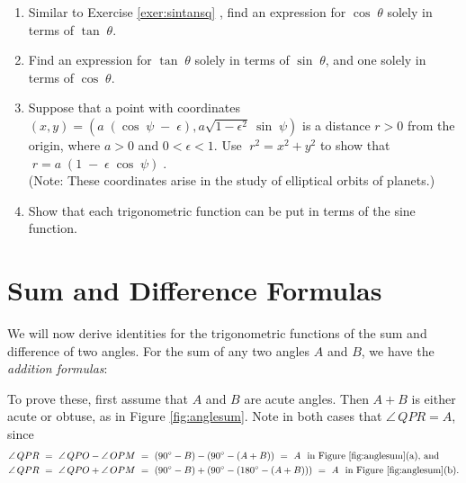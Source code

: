 {\begin{enumerate}[\bfseries 1.]
  \ref{fig:exer2.1.21} to prove the identity for $\theta$ in the other quadrants. Does the identity
  hold if $\theta$ is on either axis?
[{[\bfseries 1.]}]
 \item Similar to Exercise \ref{exer:sintansq} , find an expression for $\cos\;\theta$ solely in
  terms of $\tan\;\theta$.
 \item Find an expression for $\tan\;\theta$ solely in terms of $\sin\;\theta$, and one solely in
  terms of $\cos\;\theta$.
 \item\label{exer:marion} Suppose that a point with coordinates
  $(x,y)=(a\;(\cos\;\psi\;-\;\epsilon),a\sqrt{1 - \epsilon^2}~\sin\;\psi)$
  is a distance $r>0$ from the origin, where $a>0$ and $0 < \epsilon < 1$. Use $\;r^2 = x^2 + y^2$
  to show that $\;r = a\;(1 \;-\; \epsilon\;\cos\;\psi)\;$.\\(Note: These coordinates arise in the
  study of elliptical orbits of planets.)
 \item Show that each trigonometric function can be put in terms of the sine function.
\end{enumerate}}

\newpage
\section{Sum and Difference Formulas}
We will now derive identities for the trigonometric functions of the sum and difference of two
angles. For the sum of any two angles $A$ and $B$, we have the
\emph{addition formulas}:

\begin{center}\end{center}

To prove these, first assume that $A$ and $B$ are acute angles. Then $A+B$ is either acute or
obtuse, as in Figure \ref{fig:anglesum}. Note in both cases that $\angle\,QPR = A$, since
\begin{align*}
 \angle\,QPR ~&=~ \angle\,QPO - \angle\,OPM ~=~ (90^\circ - B) -
  (90^\circ - (A+B)) ~=~ A ~~\text{in Figure \ref{fig:anglesum}(a), and}\\
 \angle\,QPR ~&=~ \angle\,QPO + \angle\,OPM ~=~ (90^\circ - B) +
  (90^\circ - (180^\circ - (A+B))) ~=~ A ~~\text{in Figure \ref{fig:anglesum}(b).}
\end{align*}

